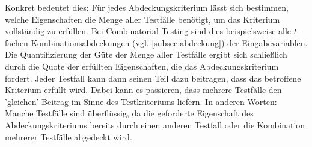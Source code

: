 Konkret bedeutet dies: Für jedes Abdeckungskriterium lässt sich bestimmen, welche Eigenschaften die Menge aller Testfälle benötigt, um das Kriterium vollständig zu erfüllen. Bei Combinatorial Testing sind dies beispielsweise alle $t$-fachen Kombinationsabdeckungen (vgl. \autoref{subsec:abdeckung}) der Eingabevariablen. Die Quantifizierung der Güte der Menge aller Testfälle ergibt sich schließlich durch die Quote der erfüllten Eigenschaften, die das Abdeckungskriterium fordert. Jeder Testfall kann dann seinen Teil dazu beitragen, dass das betroffene Kriterium erfüllt wird. Dabei kann es passieren, dass mehrere Testfälle den 'gleichen' Beitrag im Sinne des Testkriteriums liefern. In anderen Worten: Manche Testfälle sind überflüssig, da die geforderte Eigenschaft des Abdeckungskriteriums bereits durch einen anderen Testfall oder die Kombination mehrerer Testfälle abgedeckt wird. 


